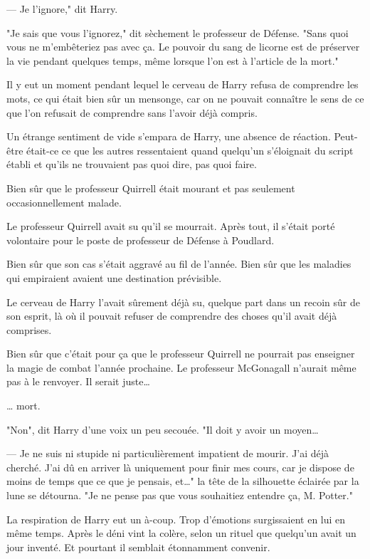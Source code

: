 --- Je l'ignore," dit Harry.

"Je sais que vous l'ignorez," dit sèchement le professeur de Défense. "Sans quoi vous ne m'embêteriez pas avec ça. Le pouvoir du sang de licorne est de préserver la vie pendant quelques temps, même lorsque l'on est à l'article de la mort."

Il y eut un moment pendant lequel le cerveau de Harry refusa de comprendre les mots, ce qui était bien sûr un mensonge, car on ne pouvait connaître le sens de ce que l'on refusait de comprendre sans l'avoir déjà compris.

Un étrange sentiment de vide s'empara de Harry, une absence de réaction. Peut-être était-ce ce que les autres ressentaient quand quelqu'un s'éloignait du script établi et qu'ils ne trouvaient pas quoi dire, pas quoi faire.

Bien sûr que le professeur Quirrell était mourant et pas seulement occasionnellement malade.

Le professeur Quirrell avait su qu'il se mourrait. Après tout, il s'était porté volontaire pour le poste de professeur de Défense à Poudlard.

Bien sûr que son cas s'était aggravé au fil de l'année. Bien sûr que les maladies qui empiraient avaient une destination prévisible.

Le cerveau de Harry l'avait sûrement déjà su, quelque part dans un recoin sûr de son esprit, là où il pouvait refuser de comprendre des choses qu'il avait déjà comprises.

Bien sûr que c'était pour ça que le professeur Quirrell ne pourrait pas enseigner la magie de combat l'année prochaine. Le professeur McGonagall n'aurait même pas à le renvoyer. Il serait juste…

… mort.

"Non", dit Harry d'une voix un peu secouée. "Il doit y avoir un moyen…

--- Je ne suis ni stupide ni particulièrement impatient de mourir. J'ai déjà cherché. J'ai dû en arriver là uniquement pour finir mes cours, car je dispose de moins de temps que ce que je pensais, et…" la tête de la silhouette éclairée par la lune se détourna. "Je ne pense pas que vous souhaitiez entendre ça, M. Potter."

La respiration de Harry eut un à-coup. Trop d'émotions surgissaient en lui en même temps. Après le déni vint la colère, selon un rituel que quelqu'un avait un jour inventé. Et pourtant il semblait étonnamment convenir.

